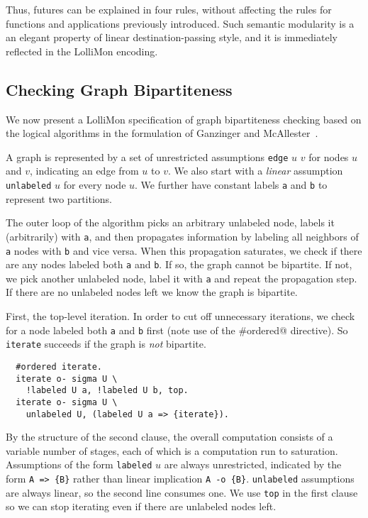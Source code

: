 \documentclass{sig-alt}
\begin{document}
Thus, futures can be explained in four rules, without affecting the rules
for functions and applications previously introduced.  Such semantic
modularity is a an elegant property of linear destination-passing style,
and it is immediately reflected in the LolliMon encoding.

\subsection{Checking Graph Bipartiteness}
\label{ssec:gbc}
We now present a LolliMon specification of graph bipartiteness
checking based on the logical algorithms in the formulation
of Ganzinger and McAllester~\cite{Ganzinger02iclp}.  

A graph is represented by a set of unrestricted assumptions
\texttt{edge} $u$ $v$ for nodes $u$ and $v$, indicating an edge
from $u$ to $v$.  We also start with a \emph{linear} assumption
\texttt{unlabeled} $u$ for every node $u$.  We further have constant
labels \texttt{a} and \texttt{b} to represent two partitions.

The outer loop of the algorithm picks an arbitrary unlabeled node,
labels it (arbitrarily) with \texttt{a}, and then propagates
information by labeling all neighbors of \texttt{a} nodes with
\texttt{b} and vice versa.  When this propagation saturates, we check if
there are any nodes labeled both \texttt{a} and \texttt{b}.  If so, the
graph cannot be bipartite.  If not, we pick another unlabeled node, label
it with \texttt{a} and repeat the propagation step.  If there are no
unlabeled nodes left we know the graph is bipartite.

First, the top-level iteration.  In order to cut off unnecessary
iterations, we check for a node labeled both \texttt{a} and \texttt{b}
first (note use of the \verb@#ordered@ directive).  So
\texttt{iterate} succeeds if the graph is \emph{not} bipartite.

\begin{small}\begin{verbatim}
  #ordered iterate.
  iterate o- sigma U \
    !labeled U a, !labeled U b, top.
  iterate o- sigma U \
    unlabeled U, (labeled U a => {iterate}).
\end{verbatim}\end{small}

\noindent By the structure of the second clause,
the overall computation consists of a variable number of
stages, each of which is a computation run to saturation.
Assumptions of the form \texttt{labeled} $u$ are always
unrestricted,
indicated by the form \texttt{A => \{B\}} rather than linear
implication \texttt{A -o \{B\}}.  \texttt{unlabeled} assumptions are
always linear, so the second line consumes one.  We use
\texttt{top} in the first clause so we can stop iterating
even if there are unlabeled nodes left.
\end{document}

